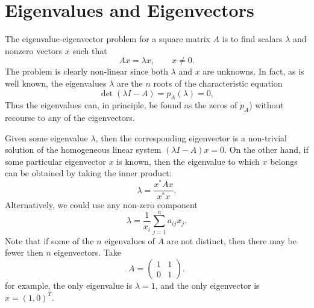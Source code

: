 \documentclass[../main.tex]{subfiles}
\begin{document}
\chapter{Eigenvalues and Eigenvectors}

The eigenvalue-eigenvector problem for a square matrix $A$ is to find scalars $\lambda$ and nonzero vectors $x$ such that
\begin{equation}
	Ax = \lambda x, \qquad x \neq 0.
\end{equation}
The problem is clearly non-linear since both $\lambda$ and $x$ are unknowns. In fact, as is well known, the eigenvalues $\lambda$ are the $n$ roots of the characteristic equation
\begin{equation}
	\det(\lambda I - A) = p_A(\lambda) = 0,
\end{equation}
Thus the eigenvalues can, in principle, be found as the zeros of $p_A$) without recourse to any of the eigenvectors.

Given some eigenvalue $\lambda$, then the corresponding eigenvector is a non-trivial solution of the homogeneous linear system $(\lambda I - A)x = 0$. On the other hand, if some particular eigenvector $x$ is known, then the eigenvalue to which $x$ belongs can be obtained by taking the inner product:
\begin{equation}
	\lambda = \frac{x^* A x}{x^* x}.
\end{equation}
Alternatively, we could use any non-zero component
\begin{equation*}
	\lambda = \frac{1}{x_i} \sum_{j=1}^n a_{ij} x_j.
\end{equation*}
Note that if some of the $n$ eigenvalues of $A$ are not distinct, then there may be fewer then $n$ eigenvectors. Take
\begin{equation*}
	A = \begin{pmatrix}
		1 & 1 \\
		0 & 1
	\end{pmatrix}.
\end{equation*}
for example, the only eigenvalue is $\lambda = 1$, and the only eigenvector is $x = (1, 0)^T$.
\end{document}
